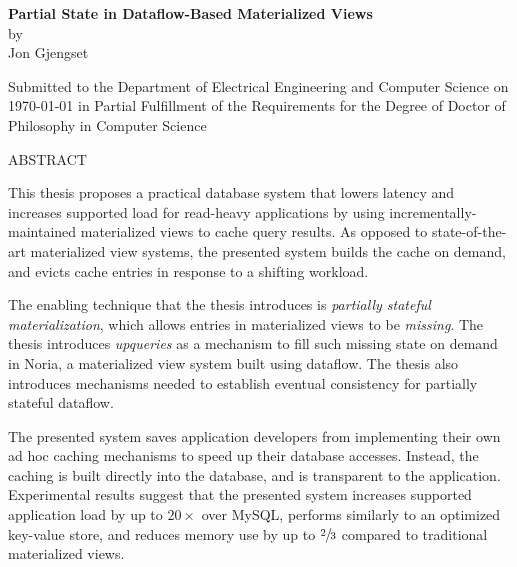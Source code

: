 \documentclass[fontsize=12pt,paper=letter]{scrartcl}
\begin{document}
\begin{titlepage}
  \begin{center}
    \textbf{\large Partial State in Dataflow-Based Materialized Views}\\
    \vspace{0.5\baselineskip}
    by\\
    \vspace{0.5\baselineskip}
    {\large Jon Gjengset}\\
    \vspace{0.5\baselineskip}
    \begin{addmargin}[0.15in]{0.15in}
      \centering
    Submitted to the Department of
    Electrical Engineering and Computer Science
    on \today{}
    in Partial Fulfillment of the Requirements for the Degree of
    Doctor of Philosophy in Computer Science
    \end{addmargin}
  \end{center}

  \begin{flushleft}
  ABSTRACT
  \vspace{0.5\baselineskip}

  This thesis proposes a practical database system that lowers latency and
    increases supported load for read-heavy applications by using
    incrementally-maintained materialized views to cache query results. As
    opposed to state-of-the-art materialized view systems, the presented system
    builds the cache on demand, and evicts cache entries in response to a
    shifting workload.

  \vspace{0.5\baselineskip}

  The enabling technique that the thesis introduces is \textit{partially
    stateful materialization}, which allows entries in materialized views to be
    \textit{missing}. The thesis introduces \textit{upqueries} as a mechanism to
    fill such missing state on demand in Noria, a materialized view system built
    using dataflow. The thesis also introduces mechanisms needed to establish
    eventual consistency for partially stateful dataflow.

  \vspace{0.5\baselineskip}

  The presented system saves application developers from implementing their own
    ad hoc caching mechanisms to speed up their database accesses. Instead, the
    caching is built directly into the database, and is transparent to the
    application. Experimental results suggest that the presented system
    increases supported application load by up to $20\times$ over MySQL,
    performs similarly to an optimized key-value store, and reduces memory use
    by up to $\sfrac{2}{3}$ compared to traditional materialized views.


\end{flushleft}
\end{titlepage}
\end{document}
